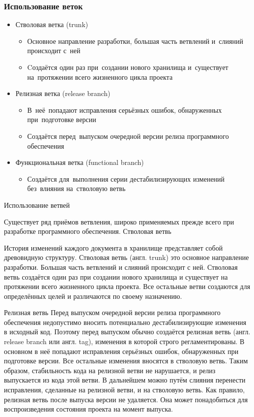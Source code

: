 \documentclass{../industrial-development}
\begin{document}
\begin{frame} \frametitle{Использование веток}
  \begin{itemize}
  \item Стволовая ветка (trunk) 
    \begin{itemize}
    \item Основное направление разработки, большая часть ветвлений и~слияний происходит с~ней
    \item Cоздаётся один раз при~создании нового хранилища и~существует на~протяжении всего жизненного цикла проекта
    \end{itemize}
  \item Релизная ветка (release branch)
    \begin{itemize}
    \item В~неё~попадают исправления серьёзных ошибок, обнаруженных при~подготовке версии
    \item Создаётся перед~выпуском очередной версии релиза программного обеспечения
    \end{itemize}
  \item Функциональная ветка (functional branch)
    \begin{itemize}
    \item Создаётся для~выполнения серии дестабилизирующих изменений без~влияния на~стволовую ветвь
    \end{itemize}
  \end{itemize}
\end{frame}

\lecturenotes

Использование ветвей

Существует ряд приёмов ветвления, широко применяемых прежде всего при разработке программного обеспечения.
Стволовая ветвь

История изменений каждого документа в хранилище представляет собой древовидную структуру. Стволовая ветвь (англ. trunk) это основное направление разработки. Большая часть ветвлений и слияний происходит с ней. Стволовая ветвь создаётся один раз при создании нового хранилища и существует на протяжении всего жизненного цикла проекта. Все остальные ветви создаются для определённых целей и различаются по своему назначению.

Релизная ветвь
Перед выпуском очередной версии релиза программного обеспечения недопустимо вносить потенциально дестабилизирующие изменения в исходный код. Поэтому перед выпуском обычно создаётся релизная ветвь (англ. release branch или англ. tag), изменения в которой строго регламентированы. В основном в неё попадают исправления серьёзных ошибок, обнаруженных при подготовке версии. Все остальные изменения вносятся в стволовую ветвь. Таким образом, стабильность кода на релизной ветви не нарушается, и релиз выпускается из кода этой ветви. В дальнейшем можно путём слияния перенести исправления, сделанные на релизной ветви, и на стволовую ветвь. Как правило, релизная ветвь после выпуска версии не удаляется. Она может понадобиться для воспроизведения состояния проекта на момент выпуска.
\end{document}
